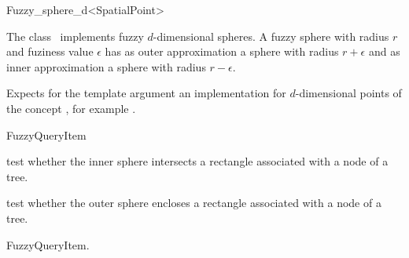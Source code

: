 

\begin{ccRefClass}{Fuzzy_sphere_d<SpatialPoint>}  %


\ccDefinition
  
The class \ccRefName\ implements fuzzy $d$-dimensional spheres.
A fuzzy sphere with radius $r$ and fuziness value $\epsilon$ has
as outer approximation a sphere with radius $r+\epsilon$ and
as inner approximation a sphere with radius $r-\epsilon$. 


\ccParameters


Expects for the template argument
an implementation for $d$-dimensional points
of the concept ,
for example .

\ccIsModel

FuzzyQueryItem

\ccTypes


\ccCreation
{}  %




\ccOperations


{test whether the inner sphere intersects a rectangle
associated with a node of a tree.}

{test whether the outer sphere encloses a rectangle
associated with a node of a tree.}

\ccSeeAlso

FuzzyQueryItem.

\end{ccRefClass}


